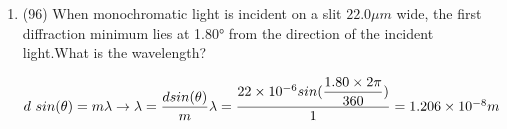 \documentclass[fleqn]{article}
\begin{document}
\begin{enumerate}
    \item (96) When monochromatic light is incident on a slit $22.0 \mu m$ wide, the first diffraction minimum lies at 1.80° from the direction of the incident light.What is the wavelength?

      \textcolor{hwColor}{ 
        $
          d~sin(\theta)=m \lambda \rightarrow \lambda=\dfrac{d sin(\theta)}{m} \\
          \\
          \lambda=\dfrac{22 \times 10^{-6} sin(\dfrac{1.80 \times 2\pi}{360})}{1}=1.206 \times 10^{-8} m
        $
      }

  \end{enumerate}
\end{document}
